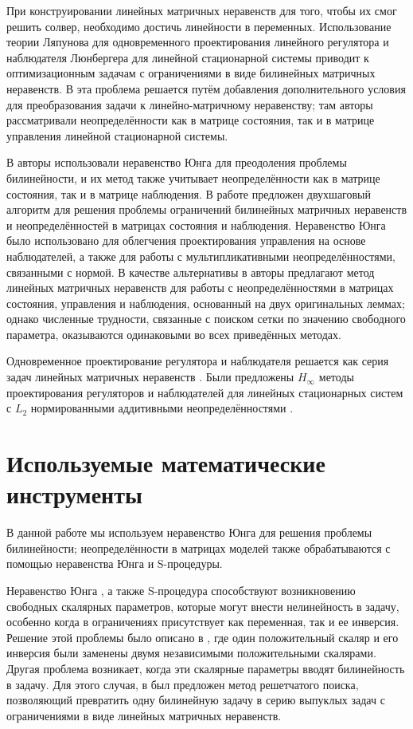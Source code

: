 При конструировании линейных матричных неравенств для того, чтобы их смог решить солвер, необходимо достичь линейности в переменных. Использование теории Ляпунова для одновременного проектирования линейного регулятора и наблюдателя Люнбергера для линейной стационарной системы приводит к оптимизационным задачам с ограничениями в виде билинейных матричных неравенств. В \cite{LIEN2004} эта проблема решается путём добавления дополнительного условия для преобразования задачи к линейно-матричному неравенству; там авторы рассматривали неопределённости как в матрице состояния, так и в матрице управления линейной стационарной системы. 

В \cite{KHELOUFI2013} авторы использовали неравенство Юнга для преодоления проблемы билинейности, и их метод также учитывает неопределённости как в матрице состояния, так и в матрице наблюдения. В работе \cite{ZEMOUCHE2015} предложен двухшаговый алгоритм для решения проблемы ограничений билинейных матричных неравенств и неопределённостей в матрицах состояния и наблюдения. Неравенство Юнга было использовано для облегчения проектирования управления на основе наблюдателей, а также для работы с мультипликативными неопределённостями, связанными с нормой. В качестве альтернативы в \cite{GRITLI2021} авторы предлагают метод линейных матричных неравенств для работы с неопределённостями в матрицах состояния, управления и наблюдения, основанный на двух оригинальных леммах; однако численные трудности, связанные с поиском сетки по значению свободного параметра, оказываются одинаковыми во всех приведённых методах.

Одновременное проектирование регулятора и наблюдателя решается как серия задач линейных матричных неравенств \cite{ZEMOUCHE2015,GRITLI2021}. Были предложены $H_\infty$ методы проектирования регуляторов и наблюдателей для линейных стационарных систем с $L_2$ нормированными аддитивными неопределённостями \cite{Bennani2019, KHELOUFI2016}.

\section{Используемые математические инструменты}\label{sec:ch1/sec7}
В данной работе мы используем неравенство Юнга для решения проблемы билинейности; неопределённости в матрицах моделей также обрабатываются с помощью неравенства Юнга и S-процедуры.

Неравенство Юнга \cite{BOYED1994}, а также S-процедура \cite{Amato2011,LIEN2008} способствуют возникновению свободных скалярных параметров, которые могут внести нелинейность в задачу, особенно когда в ограничениях присутствует как переменная, так и ее инверсия. Решение этой проблемы было описано в \cite{KHELOUFI2016}, где один положительный скаляр и его инверсия были заменены двумя независимыми положительными скалярами. Другая проблема возникает, когда эти скалярные параметры вводят билинейность в задачу. Для этого случая, в \cite{KHELOUFI2013} был предложен метод решетчатого поиска, позволяющий превратить одну билинейную задачу в серию выпуклых задач с ограничениями в виде линейных матричных неравенств.

\FloatBarrier

